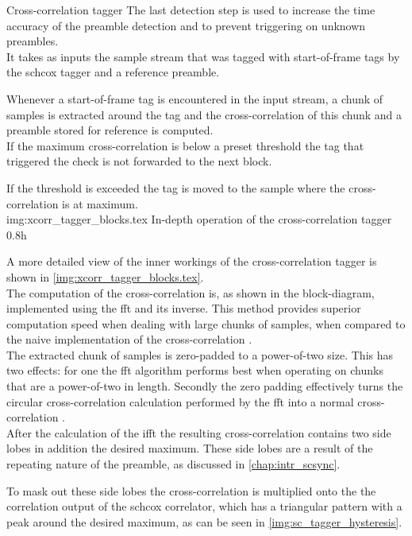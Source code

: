 \begin{subchapter}{Cross-correlation tagger}
  The last detection step is used to increase the time accuracy
  of the preamble detection and to prevent triggering on unknown
  preambles. \\

  It takes as inputs the sample stream that was tagged with
  start-of-frame tags by the \acrshort{schcox} tagger
  and a reference preamble.

  Whenever a start-of-frame tag is encountered in the input stream,
  a chunk of samples is extracted around the tag and the
  cross-correlation of this chunk and a preamble stored for reference
  is computed. \\

  If the maximum cross-correlation is below a preset threshold
  the tag that triggered the check is not forwarded to the
  next block.

  If the threshold is exceeded the tag is moved to the sample
  where the cross-correlation is at maximum. \\

               {img:xcorr_tagger_blocks.tex}
               {In-depth operation of the cross-correlation tagger}
               {0.8}{h}

  A more detailed view of the inner workings of the cross-correlation
  tagger is shown in \autoref{img:xcorr_tagger_blocks.tex}. \\

  The computation of the cross-correlation is, as shown in the
  block-diagram, implemented using the \acrlong{fft} and its inverse.
  This method provides superior computation speed when dealing
  with large chunks of samples, when compared to the naive implementation
  of the cross-correlation \cite{kammeyer2012}. \\

  The extracted chunk of samples is zero-padded to a power-of-two size.
  This has two effects: for one the \acrshort{fft} algorithm performs
  best when operating on chunks that are a power-of-two in length.
  Secondly the zero padding effectively turns the circular cross-correlation
  calculation performed by the \acrshort{fft} into a normal cross-correlation
  \cite{kammeyer2012}. \\

  After the calculation of the \acrshort{ifft} the resulting cross-correlation
  contains two side lobes in addition the desired maximum.
  These side lobes are a result of the repeating nature of the preamble, as
  discussed in \autoref{chap:intr_scsync}.

  To mask out these side lobes the cross-correlation is multiplied onto
  the the correlation output of the \acrlong{schcox} correlator,
  which has a triangular pattern with a peak around the desired
  maximum, as can be seen in \autoref{img:sc_tagger_hysteresis}.
\end{subchapter}
